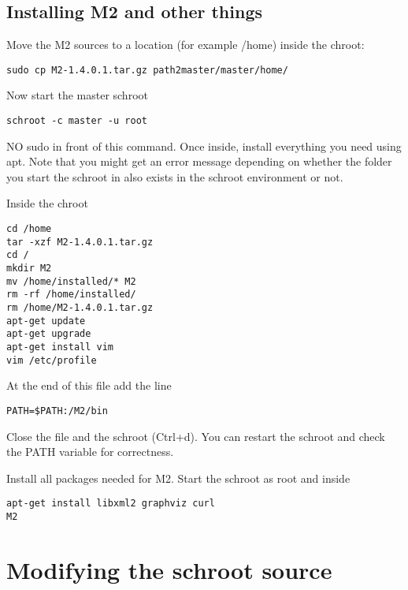\documentclass[a4paper]{book}
\begin{document}
\subsection{Installing M2 and other things}

Move the M2 sources to a location (for example /home) inside the chroot:

\begin{verbatim}
sudo cp M2-1.4.0.1.tar.gz path2master/master/home/
\end{verbatim}

Now start the master schroot

\begin{verbatim}
schroot -c master -u root
\end{verbatim}

NO sudo in front of this command. Once inside, install everything you need
using apt.  Note that you might get an error message depending on whether the
folder you start the schroot in also exists in the schroot environment or not.

Inside the chroot

\begin{verbatim}
cd /home
tar -xzf M2-1.4.0.1.tar.gz
cd /
mkdir M2
mv /home/installed/* M2
rm -rf /home/installed/
rm /home/M2-1.4.0.1.tar.gz
apt-get update
apt-get upgrade
apt-get install vim
vim /etc/profile
\end{verbatim}

At the end of this file add the line

\begin{verbatim}
PATH=$PATH:/M2/bin
\end{verbatim}

Close the file and the schroot (Ctrl+d). You can restart the schroot and check
the PATH variable for correctness.

Install all packages needed for M2. Start the schroot as root and inside

\begin{verbatim}
apt-get install libxml2 graphviz curl
M2
\end{verbatim}

\section{Modifying the schroot source}
\end{document}
